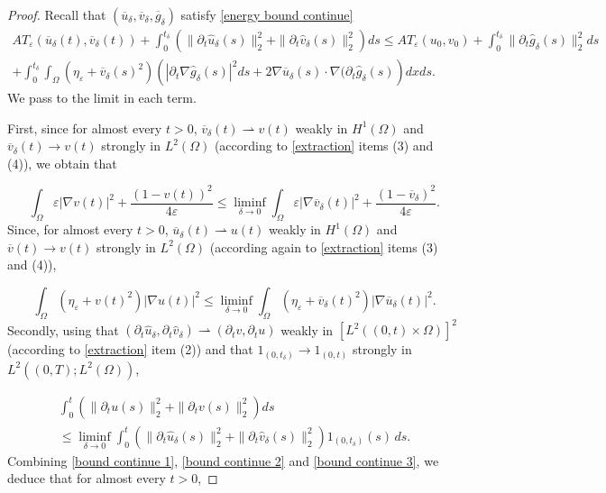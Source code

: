 \documentclass[reqno,12pt,twoside]{amsart}
\numberwithin{equation}{section} \numberwithin{theorem}{section}
\numberwithin{proposition}{section} \numberwithin{lemma}{section}
\numberwithin{corollary}{section}
\numberwithin{definition}{section} \numberwithin{remark}{section}
\begin{document}
\begin{proof}
Recall that $(\overline{u}_\delta, \overline{v}_\delta, \overline{g}_\delta)$ satisfy \eqref{energy bound continue} 
\begin{multline*}
AT_\varepsilon (\overline{u}_\delta (t) , \overline{v}_\delta (t)) + \int_0^{t_\delta} \left(\|\partial_t \hat{u}_\delta(s)\|_2^2 + \|\partial_t \hat{v}_\delta(s)\|_2^2 \right)ds 
\leqslant AT_\varepsilon (u_0 , v_0) + \int_0^{t_\delta} \|\partial_t \hat{g}_\delta (s)\|_2^2 ds\\
+ \int_0^{t_\delta}\int_\Omega (\eta_\varepsilon + \overline{v}_\delta(s)^2)\left(|\partial_t \nabla \hat{g}_\delta (s)|^2ds + 2 \nabla \overline{u}_\delta (s)\cdot \nabla (\partial_t \hat{g}_\delta (s)\right) dx ds.
\end{multline*}
We pass to the limit in each term. 

First, since for almost every $t> 0$, $\overline{v}_\delta(t) \rightharpoonup v(t)$ weakly in $H^1(\Omega)$ and $\overline{v}_\delta(t) \rightarrow v(t)$ strongly in $L^2(\Omega)$ (according to \autoref{extraction} items (3) and (4)), we obtain that 

\begin{equation}\label{bound continue 1}
\int_\Omega \varepsilon |\nabla v(t)|^2 + \frac{(1-v(t))^2}{4\varepsilon} \leqslant \liminf\limits_{\delta \rightarrow 0}\int_\Omega \varepsilon |\nabla \overline{v}_\delta(t)|^2 + \frac{(1-\overline{v}_\delta)^2}{4\varepsilon}.
\end{equation}
Since, for almost every $t >0$, $\overline{u}_\delta(t) \rightharpoonup u(t)$ weakly in $H^1(\Omega)$ and $\overline{v}(t) \rightarrow v(t)$ strongly in $L^2(\Omega)$ (according again to \autoref{extraction} items (3) and (4)), 

\begin{equation}\label{bound continue 2}
\int_\Omega(\eta_\varepsilon + v(t)^2) |\nabla u(t)|^2 \leqslant \liminf\limits_{\delta \rightarrow 0}\int_\Omega(\eta_\varepsilon + \overline{v}_\delta(t)^2) |\nabla \overline{u}_\delta(t)|^2.
\end{equation}
Secondly, using that $(\partial_t \hat{u}_\delta , \partial_t \hat{v}_\delta) \rightharpoonup (\partial_t v, \partial_t u)$ weakly in $[L^2((0,t) \times \Omega)]^2$ (according to \autoref{extraction} item (2)) and that $1_{(0,t_\delta)} \rightarrow 1_{(0,t)}$ strongly in $L^2((0,T); L^2(\Omega))$, 

\begin{multline}\label{bound continue 3}
\int_0^{t} \left(\|\partial_t u(s)\|_{2}^2 + \|\partial_t v(s)\|_{2}^2\right) ds \\
\leqslant \liminf\limits_{\delta\rightarrow 0} \int_0^{t} \left(\|\partial_t \hat{u}_\delta(s)\|_{2}^2 + \|\partial_t \hat{v}_\delta(s)\|_{2}^2\right)1_{(0,t_\delta)}(s) \, ds. 
\end{multline}
Combining \eqref{bound continue 1}, \eqref{bound continue 2} and \eqref{bound continue 3}, we deduce that for almost every $t>0$,


\end{proof}
\end{document}
